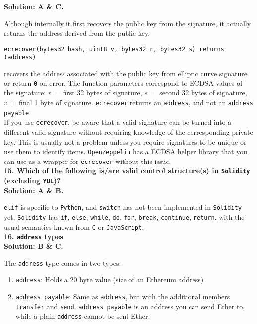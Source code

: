 \textbf{Solution: A \& C.}

Although internally it first recovers the public key from the signature, it actually returns the address derived from the public key.\\

\begin{lstlisting}[style=defaultStyle]
ecrecover(bytes32 hash, uint8 v, bytes32 r, bytes32 s) returns (address)
\end{lstlisting}

recovers the address associated with the public key from elliptic curve signature or return \verb|0| on error.
The function parameters correspond to ECDSA values of the signature: $r =$ first 32 bytes of signature, $s =$ second 32 bytes of signature, $v =$ final 1 byte of signature.
\verb|ecrecover| returns an \verb|address|, and not an \verb|address payable|.\\

If you use \verb|ecrecover|, be aware that a valid signature can be turned into a different valid signature without requiring knowledge of the corresponding private key.
This is usually not a problem unless you require signatures to be unique or use them to identify items.
\verb|OpenZeppelin| has a ECDSA helper library that you can use as a wrapper for \verb|ecrecover| without this issue.\\

\textbf{15. Which of the following is/are valid control structure(s) in \texttt{Solidity} (excluding \texttt{YUL})?}\label{sec:exam2_q15}\\

\textbf{Solution: A \& B.}

\verb|elif| is specific to \verb|Python|, and \verb|switch| has not been implemented in \verb|Solidity| yet.
\verb|Solidity| has \verb|if|, \verb|else|, \verb|while|, \verb|do|, \verb|for|, \verb|break|, \verb|continue|, \verb|return|, with the usual semantics known from \verb|C| or \verb|JavaScript|.\\

\textbf{16. \texttt{address} types}\label{sec:exam2_q16}\\

\textbf{Solution: B \& C.}

The \verb|address| type comes in two types:

\begin{enumerate}
    \item\verb|address|: Holds a 20 byte value (size of an Ethereum address)
    \item\verb|address payable|: Same as \verb|address|, but with the additional members \verb|transfer| and \verb|send|.
        \verb|address payable| is an address you can send Ether to, while a plain \verb|address| cannot be sent Ether.
\end{enumerate}

